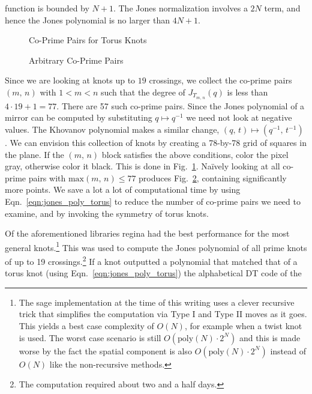 function is bounded by $N+1$. The Jones normalization involves a $2N$ term,
and hence the Jones polynomial is no larger than $4N+1$.
\begin{figure}
    \centering
    \caption{Co-Prime Pairs for Torus Knots}
    \label{fig:gcd_plot_torus_knots}
\end{figure}
\begin{figure}
    \centering
    \caption{Arbitrary Co-Prime Pairs}
    \label{fig:gcd_plot}
\end{figure}
Since we are looking at knots up to $19$ crossings, we collect the
co-prime pairs $(m,\,n)$ with $1<m<n$ such that the degree of
$J_{T_{m,\,n}}(q)$
is less than $4\cdot{19}+1=77$. There are 57 such co-prime pairs.
Since the Jones polynomial of a mirror
can be computed by substituting $q\mapsto{q}^{-1}$ we need not look at
negative values. The Khovanov polynomial makes a similar change,
$(q,\,t)\mapsto(q^{-1},\,t^{-1})$ \cite{WATSON2017915}. We can envision this
collection of knots by creating a 78-by-78 grid of squares in the plane.
If the $(m,\,n)$ block satisfies the above conditions, color the pixel gray,
otherwise color it black. This is done in Fig.~\ref{fig:gcd_plot_torus_knots}.
Na\"{i}vely looking at all co-prime pairs with $\textrm{max}(m,\,n)\leq{77}$
produces Fig.~\ref{fig:gcd_plot},
containing significantly more points. We save a lot a lot of
computational time by using Eqn.~\ref{eqn:jones_poly_torus} to reduce the
number of co-prime pairs we need to examine, and by
invoking the symmetry of torus knots.
\par\hfill\par
Of the aforementioned libraries regina had the best performance for the most
general knots.\footnote{%
    The sage implementation at the time of this writing uses a clever recursive
    trick that simplifies the computation via Type I and Type II moves as it
    goes. This yields a best case complexity of $O(N)$, for example when a
    twist knot is used. The worst case scenario is still
    $O(\textrm{poly}(N)\cdot{2}^{N})$ and this
    is made worse by the fact the spatial component is also
    $O(\textrm{poly}(N)\cdot{2}^{N})$ instead
    of $O(N)$ like the non-recursive methods.
}
This was used to compute the Jones polynomial of all prime knots of up to
19 crossings.\footnote{%
    The computation required about two and a half days.
}
If a knot outputted a polynomial that matched that of a torus
knot (using Eqn.~\ref{eqn:jones_poly_torus}) the alphabetical DT code of the
